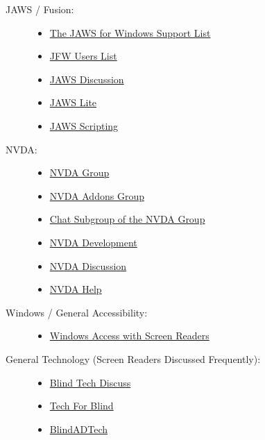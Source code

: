 \begin{description}
	\item[JAWS / Fusion:]
	      \begin{itemize}
		      \item \href{https://groups.io/g/jfw/}{The JAWS for Windows Support List}
		      \item \href{https://groups.io/g/jfw-users/}{JFW Users List}
		      \item \href{https://groups.io/g/jawsdiscussion/}{JAWS Discussion}
		      \item \href{https://groups.io/g/jawslite/}{JAWS Lite}
		      \item \href{https://groups.io/g/jawsscripting/}{JAWS Scripting}
	      \end{itemize}
	\item[NVDA:]
	      \begin{itemize}
		      \item \href{https://NVDA.groups.io/g/NVDA/}{NVDA Group}
		      \item \href{https://NVDA-addons.groups.io/g/NVDA-addons}{NVDA Addons Group}
		      \item \href{https://NVDA.groups.io/g/chat/}{Chat Subgroup of the NVDA Group}
		      \item \href{https://groups.io/g/NVDA-devel/}{NVDA Development}
		      \item \href{https://groups.io/g/NVDAdiscussion/}{NVDA Discussion}
		      \item \href{https://groups.io/g/NVDAhelp/}{NVDA Help}
	      \end{itemize}
	\item[Windows / General Accessibility:]
	      \begin{itemize}
		      \item \href{https://winaccess.groups.io/g/winaccess}{Windows Access with Screen Readers}
	      \end{itemize}
	\item[General Technology (Screen Readers Discussed Frequently):]
	      \begin{itemize}
		      \item \href{https://groups.io/g/blindtechdiscuss/}{Blind Tech Discuss}
		      \item \href{https://groups.io/g/tech-for-blind}{Tech For Blind}
		      \item \href{https://groups.io/g/blindadtech}{BlindADTech}

\end{itemize}
\end{description}
